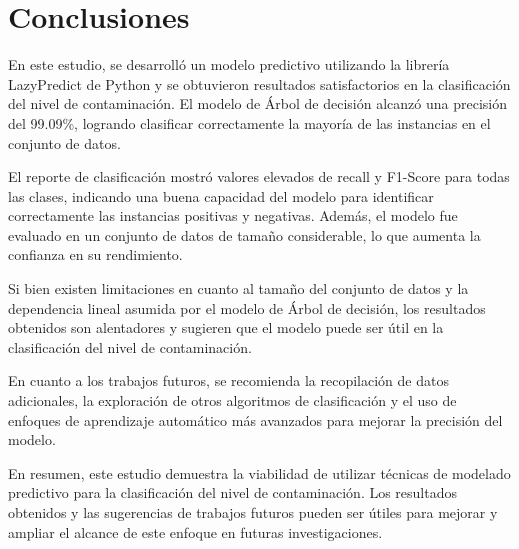 \section{Conclusiones}

En este estudio, se desarrolló un modelo predictivo utilizando la librería LazyPredict de Python y se obtuvieron resultados satisfactorios en la clasificación del nivel de contaminación. El modelo de Árbol de decisión alcanzó una precisión del 99.09\%, logrando clasificar correctamente la mayoría de las instancias en el conjunto de datos. 

El reporte de clasificación mostró valores elevados de recall y F1-Score para todas las clases, indicando una buena capacidad del modelo para identificar correctamente las instancias positivas y negativas. Además, el modelo fue evaluado en un conjunto de datos de tamaño considerable, lo que aumenta la confianza en su rendimiento.

Si bien existen limitaciones en cuanto al tamaño del conjunto de datos y la dependencia lineal asumida por el modelo de Árbol de decisión, los resultados obtenidos son alentadores y sugieren que el modelo puede ser útil en la clasificación del nivel de contaminación.

En cuanto a los trabajos futuros, se recomienda la recopilación de datos adicionales, la exploración de otros algoritmos de clasificación y el uso de enfoques de aprendizaje automático más avanzados para mejorar la precisión del modelo.

En resumen, este estudio demuestra la viabilidad de utilizar técnicas de modelado predictivo para la clasificación del nivel de contaminación. Los resultados obtenidos y las sugerencias de trabajos futuros pueden ser útiles para mejorar y ampliar el alcance de este enfoque en futuras investigaciones.

